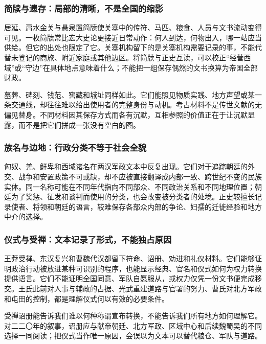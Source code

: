 \subsubsection{简牍与遗存：局部的清晰，不是全国的缩影}

居延、肩水金关与悬泉置简牍使关塞中的传符、马匹、粮食、人员与文书流动变得可见。一枚简牍常比宏大史论更接近日常动作：何人到达，何物出入，哪一站应当供给。但它的出处也限定了它。关塞机构留下的是关塞机构需要记录的事，不能代替未登记的商旅、附近家庭或其他边区。将简牍与正史互读，可以校正“经营西域”或“守边”在具体地点意味着什么；不能把一组保存偶然的文书换算为帝国全部财政。

墓葬、碑刻、钱范、窖藏和城址同样如此。它们能照见物质实践、地方声望或某一条交通线，却往往难以给出使用者的完整身份与动机。考古材料不是传世文献的无偏见替身。不同材料因其保存方式而各有沉默，互相参照的价值正在于让沉默显露，而不是把它们拼成一张没有空白的图。

\subsubsection{族名与边地：行政分类不等于社会全貌}

匈奴、羌、鲜卑和西域诸名在两汉军政文本中反复出现。它们对于追踪朝廷的外交、战争和安置政策不可或缺，却不应被直接翻译成内部一致、跨世纪不变的民族实体。同一名称可能在不同年代指向不同部众、不同政治关系和不同地理位置；朝廷为了奖惩、征发和谈判而使用的分类，也会改变被分类者的处境。正史较擅长记录使者、将领和朝廷的语言，较难保存各部众内部的争论、妇孺的迁徙经验和地方中介的选择。

\subsubsection{仪式与受禅：文本记录了形式，不能独占原因}

王莽受禅、东汉复兴和曹魏代汉都留下符命、诏册、劝进和礼仪材料。它们能够证明政治行动被放进某种可识别的程序，也能显示经典、官名和仪式如何为权力转换提供语言。它们不能证明全国同意、军队自愿服从，或权力仅凭一份文书便完成移交。王氏此前对人事与辅政的占据、光武重建道路与官署的努力、曹氏对北方军政和屯田的控制，都是理解仪式何以有效的必要条件。

\begin{debate}[仪式不是现场民意]
受禅诏册能告诉我们谁以何种称谓宣布转换，不能告诉我们所有地方如何理解它。对二二〇年的叙事，诏册应与献帝朝廷、北方军政、区域中心和后续魏蜀吴的不同选择一同阅读；把仪式当作唯一原因，会误以为文本可以替代粮仓、军队与道路。
\end{debate}


